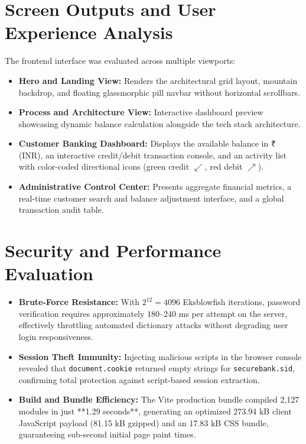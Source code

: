 \section{Screen Outputs and User Experience Analysis}
The frontend interface was evaluated across multiple viewports:
\begin{itemize}
    \item \textbf{Hero and Landing View:} Renders the architectural grid layout, mountain backdrop, and floating glassmorphic pill navbar without horizontal scrollbars.
    \item \textbf{Process and Architecture View:} Interactive dashboard preview showcasing dynamic balance calculation alongside the tech stack architecture.
    \item \textbf{Customer Banking Dashboard:} Displays the available balance in ₹ (INR), an interactive credit/debit transaction console, and an activity list with color-coded directional icons (green credit $\swarrow$, red debit $\nearrow$).
    \item \textbf{Administrative Control Center:} Presents aggregate financial metrics, a real-time customer search and balance adjustment interface, and a global transaction audit table.
\end{itemize}

\section{Security and Performance Evaluation}
\begin{itemize}
    \item \textbf{Brute-Force Resistance:} With $2^{12} = 4096$ Eksblowfish iterations, password verification requires approximately $180\text{--}240$ ms per attempt on the server, effectively throttling automated dictionary attacks without degrading user login responsiveness.
    \item \textbf{Session Theft Immunity:} Injecting malicious scripts in the browser console revealed that \texttt{document.cookie} returned empty strings for \texttt{securebank.sid}, confirming total protection against script-based session extraction.
    \item \textbf{Build and Bundle Efficiency:} The Vite production bundle compiled 2,127 modules in just **1.29 seconds**, generating an optimized 273.94 kB client JavaScript payload (81.15 kB gzipped) and an 17.83 kB CSS bundle, guaranteeing sub-second initial page paint times.
\end{itemize}

